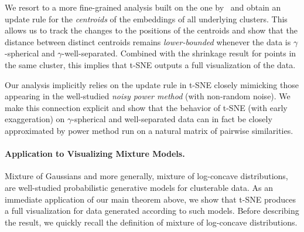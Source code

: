 We resort to a more fine-grained analysis built on the one by~\citet{linderman2017clustering} and obtain an update rule for the \emph{centroids} of the embeddings of all underlying clusters. This allows us to track the changes to the positions of the centroids and show that the distance between distinct centroids remains \emph{lower-bounded} whenever the data is $\gamma$-spherical and $\gamma$-well-separated. Combined with the shrinkage result for points in the same cluster, this implies that t-SNE outputs a full visualization of the data. %

Our analysis implicitly relies on the update rule in t-SNE closely mimicking those appearing in the well-studied \emph{noisy power method} (with non-random noise). We make this connection explicit and show that the behavior of t-SNE (with early exaggeration) on $\gamma$-spherical and well-separated data can in fact be closely approximated by power method run on a natural matrix of pairwise similarities. %



\paragraph{Application to Visualizing Mixture Models.}
Mixture of Gaussians and more generally, mixture of log-concave distributions, are well-studied probabilistic generative models for clusterable data. As an immediate application of our main theorem above, we show that t-SNE produces a full visualization for data generated according to such models. Before describing the result, we quickly recall the definition of mixture of log-concave distributions. 

